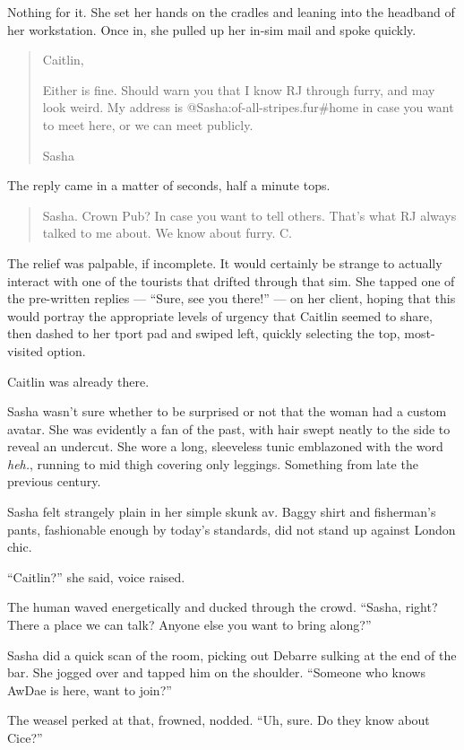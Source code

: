 Nothing for it. She set her hands on the cradles and leaning into the headband of her workstation. Once in, she pulled up her in-sim mail and spoke quickly.

\begin{quote}
Caitlin,

Either is fine. Should warn you that I know RJ through furry, and may look weird. My address is @Sasha:of-all-stripes.fur\#home in case you want to meet here, or we can meet publicly.

Sasha
\end{quote}

The reply came in a matter of seconds, half a minute tops.

\begin{quote}
Sasha. Crown Pub? In case you want to tell others. That's what RJ always talked to me about. We know about furry. C.
\end{quote}

The relief was palpable, if incomplete. It would certainly be strange to actually interact with one of the tourists that drifted through that sim. She tapped one of the pre-written replies — ``Sure, see you there!'' — on her client, hoping that this would portray the appropriate levels of urgency that Caitlin seemed to share, then dashed to her tport pad and swiped left, quickly selecting the top, most-visited option.

Caitlin was already there.

Sasha wasn't sure whether to be surprised or not that the woman had a custom avatar. She was evidently a fan of the past, with hair swept neatly to the side to reveal an undercut. She wore a long, sleeveless tunic emblazoned with the word \emph{heh.}, running to mid thigh covering only leggings. Something from late the previous century.

Sasha felt strangely plain in her simple skunk av. Baggy shirt and fisherman's pants, fashionable enough by today's standards, did not stand up against London chic.

``Caitlin?'' she said, voice raised.

The human waved energetically and ducked through the crowd. ``Sasha, right? There a place we can talk? Anyone else you want to bring along?''

Sasha did a quick scan of the room, picking out Debarre sulking at the end of the bar. She jogged over and tapped him on the shoulder. ``Someone who knows AwDae is here, want to join?''

The weasel perked at that, frowned, nodded. ``Uh, sure. Do they know about Cice?''


